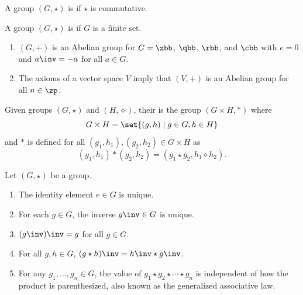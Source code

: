 A group $(G, \star)$ is  if $\star$ is commutative.

 A group $(G, \star)$ is  if $G$ is a finite set.

\begin{example}[Groups]
    \begin{enumerate}
        \item $(G, +)$ is an Abelian group for $G = \zbb$, $\qbb$, $\rbb$, and $\cbb$ with $e = 0$ and $a\inv = -a$ for all $a \in G$.
        \item The axioms of a vector space $V$ imply that $(V, +)$ is an Abelian group for all $n \in \zp$.
    \end{enumerate}
\end{example}

 Given groups $(G, \star)$ and $(H, \diamond)$, their  is the group $(G \times H, \ast)$ where
\[
    G \times H = \set{(g, h) \mid g \in G, h \in H}
\]
and $\ast$ is defined for all $(g_1, h_1), (g_2, h_2) \in G \times H$ as
\[
    (g_1, h_1) \ast (g_2, h_2) = (g_1 \star g_2, h_1 \diamond h_2).
\]

\begin{proposition}
    Let $(G, \star)$ be a group.
    \begin{enumerate}
        \item The identity element $e \in G$ is unique.
        \item For each $g \in G$, the inverse $g\inv \in G$ is unique.
        \item $(g\inv)\inv = g$ for all $g \in G$.
        \item For all $g, h \in G$, $(g \star h)\inv = h\inv \star g\inv$.
        \item For any $g_1, \ldots, g_n \in G$, the value of $g_1 \star g_2 \star \cdots \star g_n$ is independent of how the product is parenthesized, also known as the generalized associative law.
    \end{enumerate}
\end{proposition}

